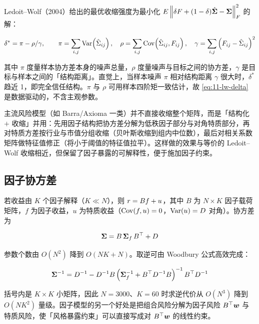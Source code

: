 Ledoit--Wolf（2004）给出的最优收缩强度为最小化 $E\left\lVert \delta F + (1-\delta)\hat{\bm{\Sigma}} - \bm{\Sigma} \right\rVert_F^{2}$ 的解：

\begin{equation}\label{eq:11-lw-delta}
  \delta^{*} = \pi - \rho/\gamma,
  \qquad
  \pi = \sum_{i,j}\operatorname{Var}\!\left(\hat{\Sigma}_{ij}\right),\quad
  \rho = \sum_{i,j}\operatorname{Cov}\!\left(\hat{\Sigma}_{ij}, F_{ij}\right),\quad
  \gamma = \sum_{i,j}\left(F_{ij} - \hat{\Sigma}_{ij}\right)^{2}
\end{equation}

其中 $\pi$ 度量样本协方差本身的噪声总量，$\rho$ 度量噪声与目标之间的协方差，$\gamma$ 是目标与样本之间的「结构距离」。直觉上，当样本噪声 $\pi$ 相对结构距离 $\gamma$ 很大时，$\delta^{*}$ 趋近 1，即完全信任结构。$\pi$ 与 $\rho$ 可用样本四阶矩一致估计，故 \cref{eq:11-lw-delta} 是数据驱动的，不含主观参数。

\begin{appbox}[实务中的用法]
主流风险模型（如 Barra/Axioma 一类）并不直接收缩整个矩阵，而是「结构化 $+$ 收缩」并用：先用因子结构把协方差分解为低秩因子部分与对角特质部分，再对特质方差按行业与市值分组收缩（贝叶斯收缩到组内中位数），最后对相关系数矩阵做特征值修正（将小于阈值的特征值拉平）。这样做的效果与等价的 Ledoit--Wolf 收缩相近，但保留了因子暴露的可解释性，便于施加因子约束。
\end{appbox}

\subsection{因子协方差}

若收益由 $K$ 个因子解释（$K \ll N$），则 $r = B f + u$，其中 $B$ 为 $N\times K$ 因子载荷矩阵，$f$ 为因子收益，$u$ 为特质收益（$\operatorname{Cov}(f,u)=0$，$\operatorname{Var}(u)=D$ 对角）。协方差为

\begin{equation}\label{eq:11-factor}
  \bm{\Sigma} = B\,\bm{\Sigma}_f\,B^{\top} + D
\end{equation}

参数个数由 $O(N^{2})$ 降到 $O(NK + N)$。取逆可由 Woodbury 公式高效完成：

\begin{equation}\label{eq:11-woodbury}
  \bm{\Sigma}^{-1} = D^{-1} - D^{-1}B\left(\bm{\Sigma}_f^{-1} + B^{\top}D^{-1}B\right)^{-1}B^{\top}D^{-1}
\end{equation}

括号内是 $K\times K$ 小矩阵，因此 $N = 3000$、$K = 60$ 时求逆代价从 $O(N^{3})$ 降到 $O(NK^{2})$ 量级。因子模型的另一个好处是把组合风险分解为因子风险 $B^{\top}\bm{w}$ 与特质风险，使「风格暴露约束」可以直接写成对 $B^{\top}\bm{w}$ 的线性约束。

